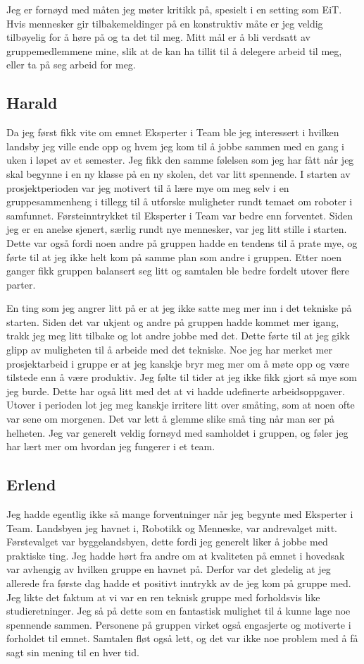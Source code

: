 Jeg er fornøyd med måten jeg møter kritikk på, spesielt i en setting som EiT. Hvis mennesker gir tilbakemeldinger på en konstruktiv måte er jeg veldig tilbøyelig for å høre på og ta det til meg. Mitt mål er å bli verdsatt av gruppemedlemmene mine, slik at de kan ha tillit til å delegere arbeid til meg, eller ta på seg arbeid for meg.

\subsection{Harald}
Da jeg først fikk vite om emnet Eksperter i Team ble jeg interessert i hvilken landsby jeg ville ende opp og hvem jeg kom til å jobbe sammen med en gang i uken i løpet av et semester. Jeg fikk den samme følelsen som jeg har fått når jeg skal begynne i en ny klasse på en ny skolen, det var litt spennende. I starten av prosjektperioden var jeg motivert til å lære mye om meg selv i en gruppesammenheng i tillegg til å utforske muligheter rundt temaet om roboter i samfunnet. Førsteinntrykket til Eksperter i Team var bedre enn forventet. Siden jeg er en anelse sjenert, særlig rundt nye mennesker, var jeg litt stille i starten. Dette var også fordi noen andre på gruppen hadde en tendens til å prate mye, og førte til at jeg ikke helt kom på samme plan som andre i gruppen. Etter noen ganger fikk gruppen balansert seg litt og samtalen ble bedre fordelt utover flere parter. 

En ting som jeg angrer litt på er at jeg ikke satte meg mer inn i det tekniske på starten. Siden det var ukjent og andre på gruppen hadde kommet mer igang, trakk jeg meg litt tilbake og lot andre jobbe med det. Dette førte til at jeg gikk glipp av muligheten til å arbeide med det tekniske. Noe jeg har merket mer prosjektarbeid i gruppe er at jeg kanskje bryr meg mer om å møte opp og være tilstede enn å være produktiv. Jeg følte til tider at jeg ikke fikk gjort så mye som jeg burde. Dette har også litt med det at vi hadde udefinerte arbeidsoppgaver. Utover i perioden lot jeg meg kanskje irritere litt over småting, som at noen ofte var sene om morgenen. Det var lett å glemme slike små ting når man ser på helheten. Jeg var generelt veldig fornøyd med samholdet i gruppen, og føler jeg har lært mer om hvordan jeg fungerer i et team.

\subsection{Erlend}
Jeg hadde egentlig ikke så mange forventninger når jeg begynte med Eksperter i Team. Landsbyen jeg havnet i, Robotikk og Menneske, var andrevalget mitt. Førstevalget var byggelandsbyen, dette fordi jeg generelt liker å jobbe med praktiske ting. Jeg hadde hørt fra andre om at kvaliteten på emnet i hovedsak var avhengig av hvilken gruppe en havnet på. Derfor var det gledelig at jeg allerede fra første dag hadde et positivt inntrykk av de jeg kom på gruppe med. Jeg likte det faktum at vi var en ren teknisk gruppe med forholdsvis like studie\-retninger. Jeg så på dette som en fantastisk mulighet til å kunne lage noe spennende sammen. Personene på gruppen virket også engasjerte og motiverte i forholdet til emnet. Samtalen fløt også lett, og det var ikke noe problem med å få sagt sin mening til en hver tid. 

